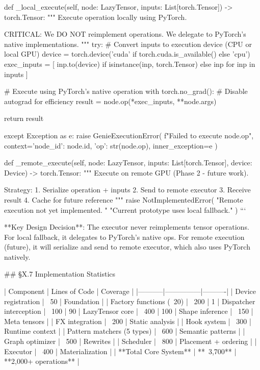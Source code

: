     def _local_execute(self, node: LazyTensor,
                       inputs: List[torch.Tensor]) -> torch.Tensor:
        """
        Execute operation locally using PyTorch.
        
        CRITICAL: We DO NOT reimplement operations.
        We delegate to PyTorch's native implementations.
        """
        try:
            # Convert inputs to execution device (CPU or local GPU)
            device = torch.device('cuda' if torch.cuda.is_available() else 'cpu')
            exec_inputs = [
                inp.to(device) if isinstance(inp, torch.Tensor) else inp
                for inp in inputs
            ]
            
            # Execute using PyTorch's native operation
            with torch.no_grad():  # Disable autograd for efficiency
                result = node.op(*exec_inputs, **node.args)
            
            return result
        
        except Exception as e:
            raise GenieExecutionError(
                f"Failed to execute {node.op}",
                context={'node_id': node.id, 'op': str(node.op)},
                inner_exception=e
            )
    
    def _remote_execute(self, node: LazyTensor, inputs: List[torch.Tensor],
                       device: Device) -> torch.Tensor:
        """
        Execute on remote GPU (Phase 2 - future work).
        
        Strategy:
        1. Serialize operation + inputs
        2. Send to remote executor
        3. Receive result
        4. Cache for future reference
        """
        raise NotImplementedError(
            "Remote execution not yet implemented. "
            "Current prototype uses local fallback."
        )
```

**Key Design Decision**: The executor never reimplements tensor operations. For local fallback, it delegates to PyTorch's native ops. For remote execution (future), it will serialize and send to remote executor, which also uses PyTorch natively.

## §X.7 Implementation Statistics

| Component | Lines of Code | Coverage |
|-----------|---------------|----------|
| Device registration | ~50 | Foundation |
| Factory functions (~20) | ~200 | 1%
| Dispatcher interception | ~100 | 90%
| LazyTensor core | ~400 | 100%
| Shape inference | ~150 | Meta tensors |
| FX integration | ~200 | Static analysis |
| Hook system | ~300 | Runtime context |
| Pattern matchers (5 types) | ~600 | Semantic patterns |
| Graph optimizer | ~500 | Rewrites |
| Scheduler | ~800 | Placement + ordering |
| Executor | ~400 | Materialization |
| **Total Core System** | **~3,700** | **2,000+ operations** |


